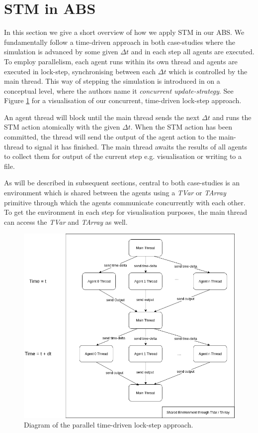 \section{STM in ABS}
\label{sec:stm_abs}
In this section we give a short overview of how we apply STM in our ABS. We fundamentally follow a time-driven approach in both case-studies where the simulation is advanced by some given $\Delta t$ and in each step all agents are executed. To employ parallelism, each agent runs within its own thread and agents are executed in lock-step, synchronising between each $\Delta t$ which is controlled by the main thread. This way of stepping the simulation is introduced in \cite{thaler_art_2017} on a conceptual level, where the authors name it \textit{concurrent update-strategy}. See Figure \ref{fig:stm_abs_structure} for a visualisation of our concurrent, time-driven lock-step approach.

An agent thread will block until the main thread sends the next $\Delta t$ and runs the STM action atomically with the given $\Delta t$. When the STM action has been committed, the thread will send the output of the agent action to the main-thread to signal it has finished. The main thread awaits the results of all agents to collect them for output of the current step e.g. visualisation or writing to a file.

As will be described in subsequent sections, central to both case-studies is an environment which is shared between the agents using a \textit{TVar} or \textit{TArray} primitive through which the agents communicate concurrently with each other. To get the environment in each step for visualisation purposes, the main thread can access the \textit{TVar} and \textit{TArray} as well. 

\begin{figure}
	\centering
	\includegraphics[width=1.0\textwidth, angle=0]{./fig/concurrentabs/stm_abs.png}
	\caption{Diagram of the parallel time-driven lock-step approach.}
	\label{fig:stm_abs_structure}
\end{figure}


